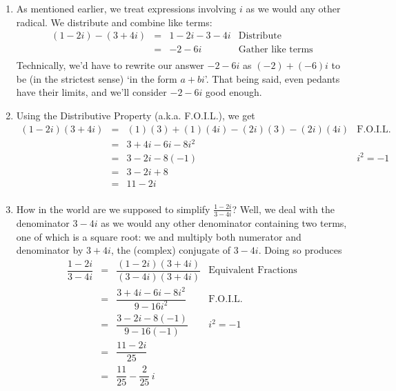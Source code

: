 {
\begin{enumerate}

\item  As mentioned earlier, we treat expressions involving $i$ as we would any other radical. We distribute and combine like terms:\[ \begin{array}{rclr}

 (1-2i) - (3+4i) & = &  1-2i-3-4i & \text{Distribute} \\
                 & = &  -2 - 6i & \text{Gather like terms} \\
\end{array}\] Technically, we'd have to rewrite our answer  $-2-6i$ as $(-2) + (-6)i$ to be (in the strictest sense) `in the form $a+bi$'. That being said, even pedants have their limits, and we'll consider $-2-6i$ good enough.

\item  Using the Distributive Property (a.k.a. F.O.I.L.), we get \[ \begin{array}{rclr}

  (1-2i)(3+4i)  & = & (1)(3) + (1)(4i) - (2i)(3) - (2i)(4i) & \text{F.O.I.L.} \\
	              & = & 3+4i-6i-8i^2 & \\
								& = & 3 - 2i - 8(-1) & \text{$i^2=-1$} \\
								& = & 3 - 2i + 8 & \\
								& = & 11 - 2i & \\ \end{array}\]

\item  How in the world are we supposed to simplify $\frac{1-2i}{3-4i}$?  Well, we deal with the denominator $3-4i$ as we would any other denominator containing two terms, one of which is a square root: we and multiply both numerator and denominator by $3+4i$, the (complex) conjugate of $3 - 4i$.  Doing so produces\[\begin{array}{rclr}

 \dfrac{1-2i}{3-4i} & = & \dfrac{(1-2i)(3+4i)}{(3-4i)(3+4i)} & \text{Equivalent Fractions} \\[8pt]

                     & = &   \dfrac{3 + 4i - 6i - 8i^2}{9 - 16i^2} & \text{F.O.I.L.}\\[8pt]
										 & = & \dfrac{3 - 2i - 8(-1)}{9  - 16(-1)} & \text{$i^2 = -1$}\\[8pt]
						         & = &  \dfrac{11 - 2i}{25} & \\[8pt]
										  & = & \dfrac{11}{25} - \dfrac{2}{25} \, i & \\ \end{array}\]
										


\end{enumerate}}
